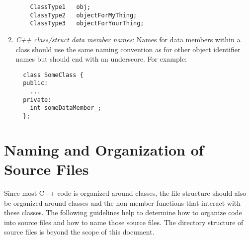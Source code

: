 \begin{enumerate}
{\small\begin{verbatim}
    ClassType1   obj;
    ClassType2   objectForMyThing;
    ClassType3   objectForYourThing;
\end{verbatim}}
{}\item\textit{C++ class/struct data member names}: Names for data members
within a class should use the same naming convention as for other object
identifier names but should end with an underscore.  For example:

{\small\begin{verbatim}
  class SomeClass {
  public:
    ...
  private:
    int someDataMember_;
  };
\end{verbatim}}

\end{enumerate}

%
\section{Naming and Organization of Source Files}
%

Since most C++ code is organized around classes, the file structure should
also be organized around classes and the non-member functions that interact
with these classes.  The following guidelines help to determine how to
organize code into source files and how to name those source files.  The
directory structure of source files is beyond the scope of this document.

